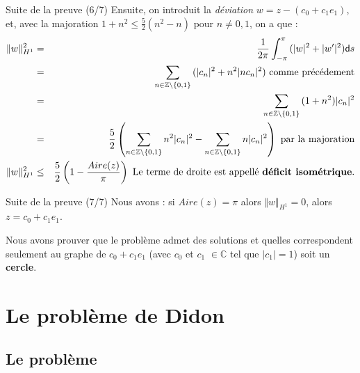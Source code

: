\documentclass[11pt,envcountsect,aspectratio=169]{beamer} %
\newcommand{\Z}{\mathbb{Z}}
\renewcommand{\d}{\mathsf{d}}
\renewcommand{\ss}{\vspace*{\baselineskip}}
\begin{document}
\begin{frame}{Suite de la preuve (6/7)}
    Ensuite, on introduit la \emph{déviation} $w=z-(c_0+c_1e_1)$, et, avec la majoration $1+n^2\leqslant \frac{5}{2}(n^2-n)$ pour $n\neq 0,1$, on a que :
    \begin{eqnarray*}
    \Vert w\Vert_{H^1}^2 &=& \frac{1}{2\pi} \int_{-\pi}^{\pi}{ (|w|^2+|w'|^2)\d s} \\
    &=& \sum_{n\in \Z\backslash \{0,1\}}{(|c_n|^2+ n^2|nc_n|^2)} \text{ comme précédement} \\
    &=& \sum_{n\in \Z\backslash \{0,1\}}{(1+n^2) |c_n|^2 } \\
    &=& \frac{5}{2} \left( \sum_{n\in \Z\backslash \{0,1\}}{n^2|c_n|^2} - \sum_{n\in \Z\backslash \{0,1\}}{n|c_n|^2} \right) \text{ par la majoration} \\
    \Vert w\Vert_{H^1}^2 &\leq& \frac{5}{2} \left(1-\frac{Aire(z)}{\pi}\right) \text{ Le terme de droite est appellé \textbf{déficit isométrique}.}
    \end{eqnarray*}
    
\end{frame}

\begin{frame}{Suite de la preuve (7/7)}
    Nous avons : si $Aire(z)=\pi$ alors $\Vert w \Vert_{H^1} = 0$, alors $z=c_0+c_1e_1$.
    \ss
    
    Nous avons prouver que le problème admet des solutions et quelles correspondent seulement au graphe de $c_0+c_1e_1$ (avec $c_0$ et $c_1$ $\in \mathbb{C}$ tel que $|c_1|=1$) soit un \textbf{cercle}.
\end{frame}










\section{Le problème de Didon}


\subsection{Le problème}
\end{document}
